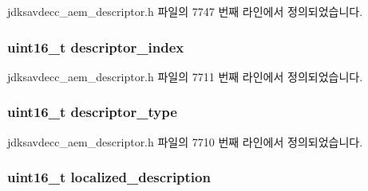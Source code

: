jdksavdecc\+\_\+aem\+\_\+descriptor.\+h 파일의 7747 번째 라인에서 정의되었습니다.

\subsubsection[{\texorpdfstring{descriptor\+\_\+index}{descriptor_index}}]{\setlength{\rightskip}{0pt plus 5cm}uint16\+\_\+t descriptor\+\_\+index}\hypertarget{structjdksavdecc__descriptor__audio__unit_a042bbc76d835b82d27c1932431ee38d4}{}\label{structjdksavdecc__descriptor__audio__unit_a042bbc76d835b82d27c1932431ee38d4}


jdksavdecc\+\_\+aem\+\_\+descriptor.\+h 파일의 7711 번째 라인에서 정의되었습니다.

\subsubsection[{\texorpdfstring{descriptor\+\_\+type}{descriptor_type}}]{\setlength{\rightskip}{0pt plus 5cm}uint16\+\_\+t descriptor\+\_\+type}\hypertarget{structjdksavdecc__descriptor__audio__unit_ab7c32b6c7131c13d4ea3b7ee2f09b78d}{}\label{structjdksavdecc__descriptor__audio__unit_ab7c32b6c7131c13d4ea3b7ee2f09b78d}


jdksavdecc\+\_\+aem\+\_\+descriptor.\+h 파일의 7710 번째 라인에서 정의되었습니다.

\subsubsection[{\texorpdfstring{localized\+\_\+description}{localized_description}}]{\setlength{\rightskip}{0pt plus 5cm}uint16\+\_\+t localized\+\_\+description}\hypertarget{structjdksavdecc__descriptor__audio__unit_a0926f846ca65a83ad5bb06b4aff8f408}{}\label{structjdksavdecc__descriptor__audio__unit_a0926f846ca65a83ad5bb06b4aff8f408}


